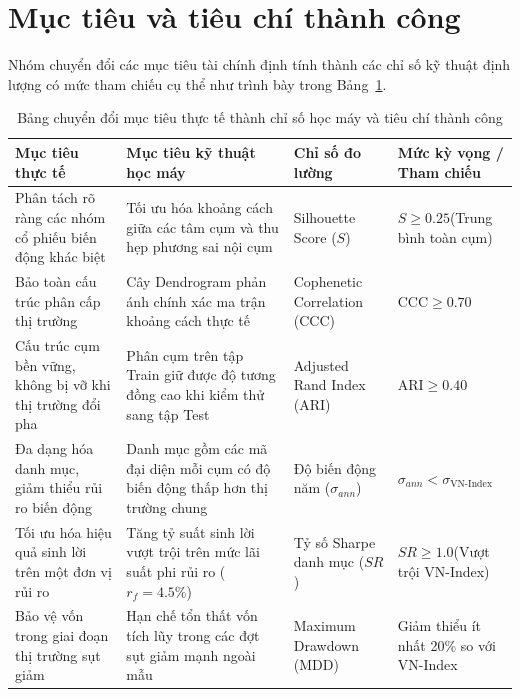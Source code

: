 \documentclass[12pt,a4paper,oneside,openany]{report}
\begin{document}
\section{Mục tiêu và tiêu chí thành công}
Nhóm chuyển đổi các mục tiêu tài chính định tính thành các chỉ số kỹ thuật định lượng có mức tham chiếu cụ thể như trình bày trong Bảng~\ref{tab:muctieu_chiso}.

\begin{table}[H]
  \centering
  \caption{Bảng chuyển đổi mục tiêu thực tế thành chỉ số học máy và tiêu chí thành công}
  \label{tab:muctieu_chiso}
  \begin{tabularx}{\textwidth}{|p{3.2cm}|X|p{2.8cm}|>{\centering\arraybackslash}p{2.5cm}|}
    \hline
    \rowcolor{black!8}\textbf{Mục tiêu thực tế} & \textbf{Mục tiêu kỹ thuật học máy} & \textbf{Chỉ số đo lường} & \textbf{Mức kỳ vọng / Tham chiếu} \\ \hline
    Phân tách rõ ràng các nhóm cổ phiếu biến động khác biệt & Tối ưu hóa khoảng cách giữa các tâm cụm và thu hẹp phương sai nội cụm & Silhouette Score ($S$) & $S \ge 0.25$\newline (Trung bình toàn cụm) \\ \hline
    Bảo toàn cấu trúc phân cấp thị trường & Cây Dendrogram phản ánh chính xác ma trận khoảng cách thực tế & Cophenetic Correlation (CCC) & $\text{CCC} \ge 0.70$ \\ \hline
    Cấu trúc cụm bền vững, không bị vỡ khi thị trường đổi pha & Phân cụm trên tập Train giữ được độ tương đồng cao khi kiểm thử sang tập Test & Adjusted Rand Index (ARI) & $\text{ARI} \ge 0.40$ \\ \hline
    Đa dạng hóa danh mục, giảm thiểu rủi ro biến động & Danh mục gồm các mã đại diện mỗi cụm có độ biến động thấp hơn thị trường chung & Độ biến động năm ($\sigma_{ann}$) & $\sigma_{ann} < \sigma_{\text{VN-Index}}$ \\ \hline
    Tối ưu hóa hiệu quả sinh lời trên một đơn vị rủi ro & Tăng tỷ suất sinh lời vượt trội trên mức lãi suất phi rủi ro ($r_f = 4.5\%$) & Tỷ số Sharpe danh mục ($SR$) & $SR \ge 1.0$\newline (Vượt trội VN-Index) \\ \hline
    Bảo vệ vốn trong giai đoạn thị trường sụt giảm & Hạn chế tổn thất vốn tích lũy trong các đợt sụt giảm mạnh ngoài mẫu & Maximum Drawdown (MDD) & Giảm thiểu ít nhất 20\% so với VN-Index \\ \hline
  \end{tabularx}
\end{table}
\end{document}
